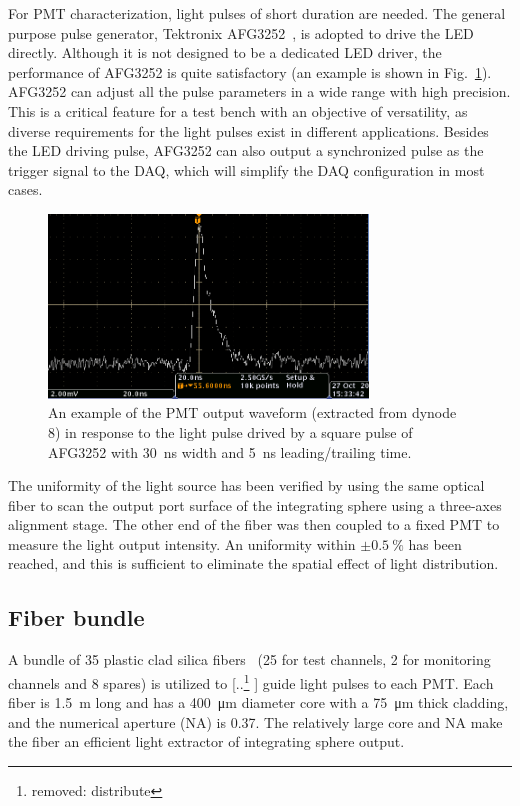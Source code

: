 \documentclass{nst}
\providecommand{\DIFadd}[1]{{\protect\color{blue} \sf #1}} %
\providecommand{\DIFdel}[1]{{\protect\color{red} [..\footnote{removed: #1} ]}} %
\providecommand{\DIFaddbegin}{} %
\providecommand{\DIFaddend}{} %
\providecommand{\DIFdelbegin}{} %
\providecommand{\DIFdelend}{} %
\begin{document}
For PMT characterization, light pulses of short duration are needed.
The general purpose pulse generator, Tektronix AFG3252~\cite{afg3252}, is adopted to drive the LED directly.
Although it is not designed to be a dedicated LED driver, the performance of AFG3252 is quite satisfactory (an example is shown in Fig.~\ref{fig:FIG4}).
AFG3252 can adjust all the pulse parameters in a wide range with high precision. This is a critical feature for a test bench with an objective of versatility, as diverse requirements for the light pulses exist in different applications. 
Besides the LED driving pulse, AFG3252 can also output a synchronized pulse as the trigger signal to the DAQ, which will simplify the DAQ configuration in most cases. 

\begin{figure}[!htb]
	\centering
	\includegraphics[width=85mm]{FIG4.jpg}
	\caption{An example of the PMT output waveform (extracted from dynode 8) in response to the light pulse drived by a square pulse of AFG3252 with \SI{30}{\nano\second} width and \SI{5}{\nano\second} leading/trailing time.}
	\label{fig:FIG4}
\end{figure} 

The uniformity of the light source has been verified by using the same optical fiber to scan the output port surface of the integrating sphere using a three-axes alignment stage. The other end of the fiber was then coupled to a fixed PMT to measure the light output intensity.
An uniformity within $\pm\SI{0.5}{\percent}$ has been reached, and this is sufficient to eliminate the spatial effect of light distribution.

\subsection{Fiber bundle}
\label{sec:fiber_bundle}

A bundle of 35 plastic clad silica fibers~\cite{optical_fibre} (25 for test channels, 2 for monitoring channels and 8 spares) is utilized to \DIFdelbegin \DIFdel{distribute }\DIFdelend \DIFaddbegin \DIFadd{guide }\DIFaddend light pulses to each PMT.	Each fiber is \SI{1.5}{\meter} long and has a \SI{400}{\micro\meter} diameter core with a \SI{75}{\micro\meter} thick cladding, and the numerical aperture (NA) is 0.37.
The relatively large core and NA make the fiber an efficient light extractor of integrating sphere output. 
\end{document}
